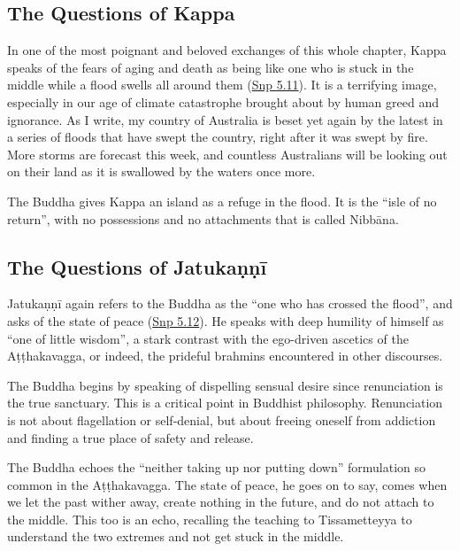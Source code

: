 \documentclass[12pt,openany]{book}%
\begin{document}
\subsection*{The Questions of Kappa}

In one of the most poignant and beloved exchanges of this whole chapter, Kappa speaks of the fears of aging and death as being like one who is stuck in the middle while a flood swells all around them (\href{https://suttacentral.net/snp5.11/en/sujato}{Snp 5.11}). It is a terrifying image, especially in our age of climate catastrophe brought about by human greed and ignorance. As I write, my country of Australia is beset yet again by the latest in a series of floods that have swept the country, right after it was swept by fire. More storms are forecast this week, and countless Australians will be looking out on their land as it is swallowed by the waters once more.

The Buddha gives Kappa an island as a refuge in the flood. It is the “isle of no return”, with no possessions and no attachments that is called \textsanskrit{Nibbāna}.

\subsection*{The Questions of \textsanskrit{Jatukaṇṇī}}

\textsanskrit{Jatukaṇṇī} again refers to the Buddha as the “one who has crossed the flood”, and asks of the state of peace (\href{https://suttacentral.net/snp5.12/en/sujato}{Snp 5.12}). He speaks with deep humility of himself as “one of little wisdom”, a stark contrast with the ego-driven ascetics of the \textsanskrit{Aṭṭhakavagga}, or indeed, the prideful brahmins encountered in other discourses.

The Buddha begins by speaking of dispelling sensual desire since renunciation is the true sanctuary. This is a critical point in Buddhist philosophy. Renunciation is not about flagellation or self-denial, but about freeing oneself from addiction and finding a true place of safety and release.

The Buddha echoes the “neither taking up nor putting down” formulation so common in the \textsanskrit{Aṭṭhakavagga}. The state of peace, he goes on to say, comes when we let the past wither away, create nothing in the future, and do not attach to the middle. This too is an echo, recalling the teaching to Tissametteyya to understand the two extremes and not get stuck in the middle.
\end{document}
